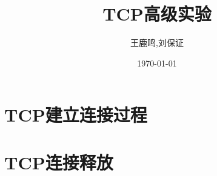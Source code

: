 \documentclass[11pt, a4paper,oneside]{book}
\theoremstyle{ocrenumbox}
\theoremstyle{purplenumbox}
\theoremstyle{blackbox}
\begin{document}
\pagestyle{empty} %
\title{TCP高级实验}
\author{王鹿鸣,刘保证}
\date{\today}
\maketitle
\setcounter{secnumdepth}{3}
\frontmatter
\tableofcontents

\mainmatter
\pagestyle{fancy}



\chapter{TCP建立连接过程}
\minitoc
    
    

\chapter{TCP连接释放}
\minitoc





\end{document}
